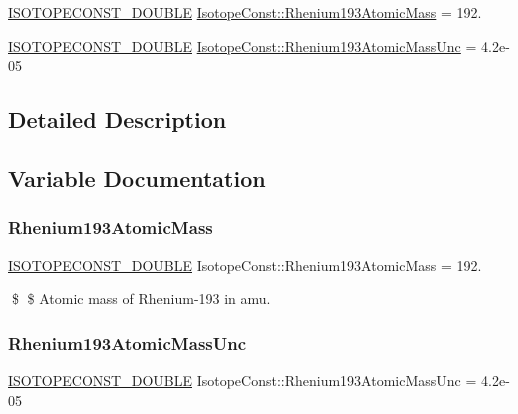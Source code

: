 \begin{DoxyCompactItemize}
\item 
\mbox{\hyperlink{group___isotope_const-_macros_ga8f45a7272ce02c0b4c65c44636ed719a}{I\+S\+O\+T\+O\+P\+E\+C\+O\+N\+S\+T\+\_\+\+D\+O\+U\+B\+LE}} \mbox{\hyperlink{group___isotope_const-_rhenium-_re193_ga4eb7c5a2702e2852919f6311d2484a8b}{Isotope\+Const\+::\+Rhenium193\+Atomic\+Mass}} = 192.
\item 
\mbox{\hyperlink{group___isotope_const-_macros_ga8f45a7272ce02c0b4c65c44636ed719a}{I\+S\+O\+T\+O\+P\+E\+C\+O\+N\+S\+T\+\_\+\+D\+O\+U\+B\+LE}} \mbox{\hyperlink{group___isotope_const-_rhenium-_re193_ga72b3ede524db9c27cd4877c07d03ed11}{Isotope\+Const\+::\+Rhenium193\+Atomic\+Mass\+Unc}} = 4.\+2e-\/05
\end{DoxyCompactItemize}


\subsection{Detailed Description}


\subsection{Variable Documentation}
\mbox{\label{group___isotope_const-_rhenium-_re193_ga4eb7c5a2702e2852919f6311d2484a8b}} 
\subsubsection{\texorpdfstring{Rhenium193\+Atomic\+Mass}{Rhenium193AtomicMass}}
{\footnotesize\ttfamily \mbox{\hyperlink{group___isotope_const-_macros_ga8f45a7272ce02c0b4c65c44636ed719a}{I\+S\+O\+T\+O\+P\+E\+C\+O\+N\+S\+T\+\_\+\+D\+O\+U\+B\+LE}} Isotope\+Const\+::\+Rhenium193\+Atomic\+Mass = 192.}

\$ \$ Atomic mass of Rhenium-\/193 in amu. \mbox{\label{group___isotope_const-_rhenium-_re193_ga72b3ede524db9c27cd4877c07d03ed11}} 
\subsubsection{\texorpdfstring{Rhenium193\+Atomic\+Mass\+Unc}{Rhenium193AtomicMassUnc}}
{\footnotesize\ttfamily \mbox{\hyperlink{group___isotope_const-_macros_ga8f45a7272ce02c0b4c65c44636ed719a}{I\+S\+O\+T\+O\+P\+E\+C\+O\+N\+S\+T\+\_\+\+D\+O\+U\+B\+LE}} Isotope\+Const\+::\+Rhenium193\+Atomic\+Mass\+Unc = 4.\+2e-\/05}


